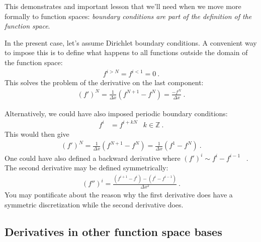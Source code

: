 \documentclass[12pt]{article}
\numberwithin{equation}{section}    %
\begin{document}
This demonstrates and important lesson that we’ll need when we move more formally to function spaces: \emph{boundary conditions are part of the definition of the function space}. 

In the present case, let’s assume Dirichlet boundary conditions. A convenient way to impose this is to define what happens to all functions outside the domain of the function space:
\begin{align}
  f^{i > N} = f^{i < 1} = 0 \ .
\end{align}
This solves the problem of the derivative on the last component:
\begin{align}
  {(f')}^N = \frac{1}{\Delta x}(f^{N+1} - f^N) 
  = 
  \frac{- f^N}{\Delta x}  \ .
\end{align}

Alternatively, we could have also imposed periodic boundary conditions:
\begin{align}
  f^{i} &= f^{i+ kN}
  & k\in \mathbb{Z} \ .
\end{align}
This would then give
\begin{align}
  {(f')}^N = \frac{1}{\Delta x}(f^{N+1} - f^N) 
  = 
  \frac{1}{\Delta x}(f^{1} - f^N) 
  \ .
\end{align}
One could have also defined a backward derivative where $(f')^i \sim f^{i}-f^{i-1}$ \ . The second derivative may be defined symmetrically:
\begin{align}
  (f'')^i = \frac{(f^{i+1} - f^i) - (f^i - f^{i-1})}{\Delta x^2} \ .
\end{align}
You may pontificate about the reason why the first derivative does have a symmetric discretization while the second derivative does. 


\subsection{Derivatives in other function space bases}
\end{document}
